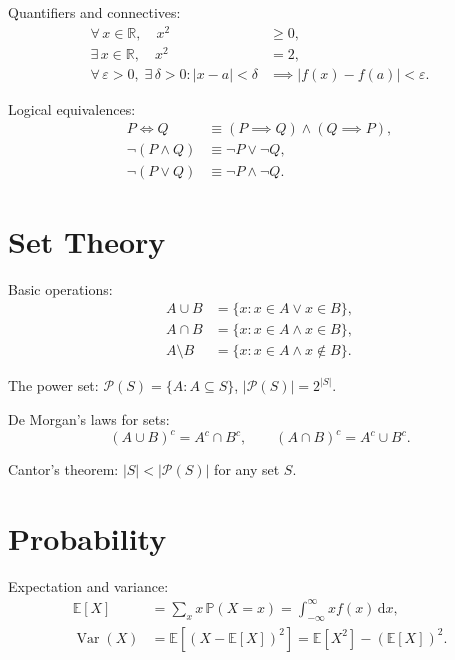 \documentclass[
    language=english,
    doctype=article,
    institution=none,
    titlestyle=book,
]{../../omnilatex}
\DeclareMathOperator{\Var}{Var}
\theoremstyle{plain}
\theoremstyle{definition}
\theoremstyle{remark}
\begin{document}
Quantifiers and connectives:
\begin{align}
    \forall\, x \in \mathbb{R},\quad x^2 &\geq 0, \label{eq:universal}\\
    \exists\, x \in \mathbb{R},\quad x^2 &= 2, \label{eq:existential}\\
    \forall\, \varepsilon > 0,\;\exists\, \delta > 0 : |x - a| < \delta
        &\implies |f(x) - f(a)| < \varepsilon. \label{eq:epsilon-delta}
\end{align}

Logical equivalences:
\begin{align}
    P \iff Q &\equiv (P \implies Q) \land (Q \implies P), \label{eq:biconditional}\\
    \lnot(P \land Q) &\equiv \lnot P \lor \lnot Q, \label{eq:demorgan}\\
    \lnot(P \lor Q) &\equiv \lnot P \land \lnot Q. \label{eq:demorgan2}
\end{align}

\section{Set Theory}
\label{sec:set-theory}

Basic operations:
\begin{align}
    A \cup B &= \{x : x \in A \lor x \in B\}, \label{eq:union}\\
    A \cap B &= \{x : x \in A \land x \in B\}, \label{eq:intersection}\\
    A \setminus B &= \{x : x \in A \land x \notin B\}. \label{eq:difference}
\end{align}

The power set: $\mathcal{P}(S) = \{A : A \subseteq S\}$, $|\mathcal{P}(S)| = 2^{|S|}$.

De Morgan's laws for sets:
\[
    (A \cup B)^c = A^c \cap B^c, \qquad (A \cap B)^c = A^c \cup B^c.
\]

Cantor's theorem: $|S| < |\mathcal{P}(S)|$ for any set $S$.

\section{Probability}
\label{sec:probability}

Expectation and variance:
\begin{align}
    \mathbb{E}[X] &= \sum_{x} x\,\mathbb{P}(X = x) = \int_{-\infty}^{\infty} x f(x)\,\mathup{d}x, \label{eq:expectation}\\
    \Var(X) &= \mathbb{E}[(X - \mathbb{E}[X])^2] = \mathbb{E}[X^2] - (\mathbb{E}[X])^2. \label{eq:variance}
\end{align}
\end{document}
